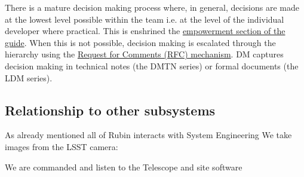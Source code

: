 There is a mature decision making process where, in general, decisions are made at the lowest level possible within the team i.e. at the level of the individual developer where practical. This is enshrined the \href{https://developer.lsst.io/team/empowerment.html}{empowerment section of the guide}.
When this is not possible, decision making is escalated through the hierarchy using  the \href{https://developer.lsst.io/communications/rfc.html}{Request for Comments (RFC) mechanism}.
DM captures decision making in technical notes (the DMTN series) or formal documents (the LDM series).


\subsection{Relationship to other subsystems}

As already mentioned all of Rubin interacts with System Engineering
   We take images from the  LSST camera: \cite{2010SPIE.7735E..0JK}

   We are commanded and listen to the  Telescope  and site software  \cite{2014SPIE.9145E..1AG}


